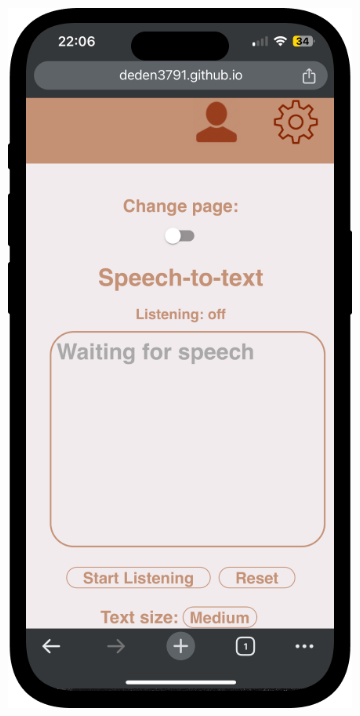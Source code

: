 \documentclass{l4proj}
\begin{document}
\begin{figure}
    \centering
    \begin{subfigure}[b]{0.30\textwidth}
        \includegraphics[width=\textwidth]{dissertation/images/captions-phone.png}

\end{subfigure}
\end{figure}
\end{document}
